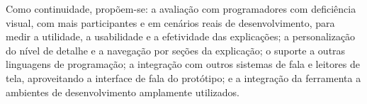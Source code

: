 \documentclass[
    12pt,                   %
    openright,              %
    oneside,                %
    a4paper,                %
    sumario=tradicional,    %
    english,                %
    brazil,                 %
    ]{abntex2}
\begin{document}
Como continuidade, propõem-se: a avaliação com programadores com deficiência visual, com mais participantes e em cenários reais de desenvolvimento, para medir a utilidade, a usabilidade e a efetividade das explicações; a personalização do nível de detalhe e a navegação por seções da explicação; o suporte a outras linguagens de programação; a integração com outros sistemas de fala e leitores de tela, aproveitando a interface de fala do protótipo; e a integração da ferramenta a ambientes de desenvolvimento amplamente utilizados.





\end{document}
